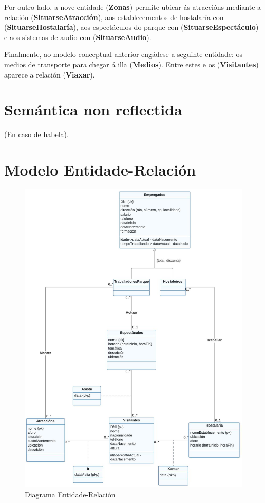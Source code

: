 \documentclass[12pt,a4paper]{book}
\theoremstyle{definition}
\theoremstyle{break}
\begin{document}
Por outro lado, a nove entidade (\textbf{Zonas}) permite ubicar ás atraccións mediante a relación (\textbf{SituarseAtracción}), aos establecementos de hostalaría con (\textbf{SituarseHostalaría}), aos espectáculos do parque con (\textbf{SituarseEspectáculo}) e aos sistemas de audio con (\textbf{SituarseAudio}).

Finalmente, ao modelo conceptual anterior engádese a seguinte entidade: os medios de transporte para chegar á illa (\textbf{Medios}). Entre estes e os (\textbf{Visitantes}) aparece a relación (\textbf{Viaxar}).

\section{Semántica non reflectida}
(En caso de habela).


\newpage

\section{Modelo Entidade-Relación}

\begin{figure} [H] \centering
	\caption{Diagrama Entidade-Relación}
	\includegraphics[width=\textwidth]{mer.jpg}
\end{figure}
\newpage
\end{document}
